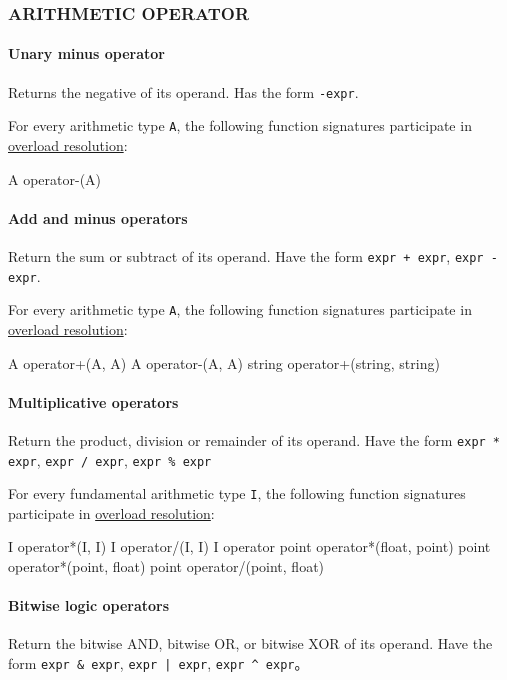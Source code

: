 \documentclass{article}
\begin{document}
\subsubsection{ARITHMETIC OPERATOR}
\label{suanshu}

\paragraph{Unary minus operator} Returns the negative of its operand. Has the form \verb|-expr|.

For every arithmetic type \verb|A|, the following function signatures participate in \hyperref[chongzai]{overload resolution}:
\begin{MUAvbt}
A operator-(A)
\end{MUAvbt}

\paragraph{Add and minus operators} Return the sum or subtract of its operand. Have the form \verb|expr + expr|, \verb|expr - expr|.

For every arithmetic type \verb|A|, the following function signatures participate in \hyperref[chongzai]{overload resolution}:
\begin{MUAvbt}
A operator+(A, A)
A operator-(A, A)
string operator+(string, string)
\end{MUAvbt}

\paragraph{Multiplicative operators} Return the product, division or remainder of its operand. Have the form \verb|expr * expr|, \verb|expr / expr|, \verb|expr % expr|

For every fundamental arithmetic type \verb|I|, the following function signatures participate in \hyperref[chongzai]{overload resolution}:
\begin{MUAvbt}
I operator*(I, I)
I operator/(I, I)
I operator%
point operator*(float, point)
point operator*(point, float)
point operator/(point, float)
\end{MUAvbt}

\paragraph{Bitwise logic operators} Return the bitwise AND, bitwise OR, or bitwise XOR of its operand. Have the form \verb|expr & expr|, \verb&expr | expr&, \verb|expr ^ expr|。
\end{document}

